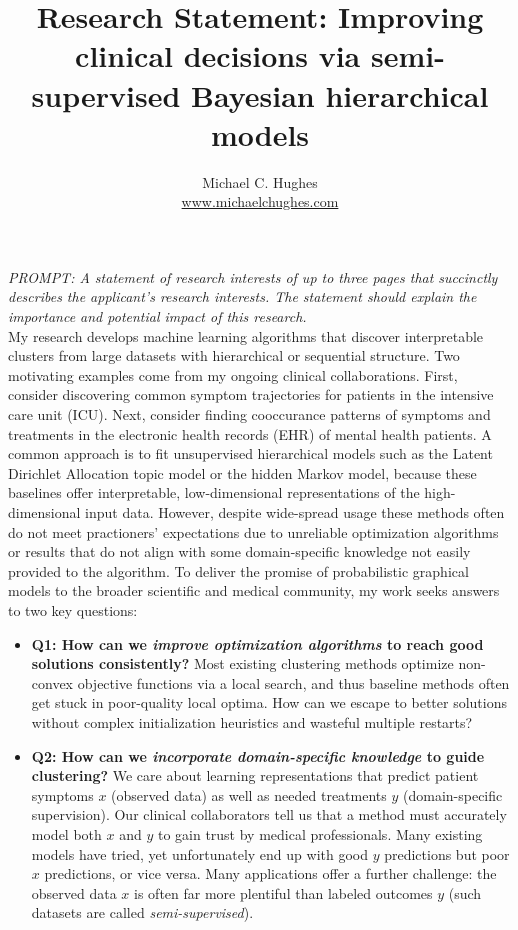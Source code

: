\documentclass[11pt,letterpaper,sans]{article}
\title{Research Statement: Improving clinical decisions via semi-supervised Bayesian hierarchical models}
\author{Michael C. Hughes \\ 
    \url{www.michaelchughes.com}
}
\begin{document}
\maketitle

\emph{PROMPT: A statement of research interests of up to three pages that succinctly describes the applicant's research interests. The statement should explain the importance and potential impact of this research.}
\\

My research develops machine learning
algorithms that discover interpretable clusters from large datasets with hierarchical or sequential structure.
Two motivating examples come from my ongoing clinical collaborations.
First, consider 
discovering common symptom trajectories for patients in the intensive care unit (ICU).
Next, consider finding cooccurance patterns of 
symptoms and treatments
in the electronic health records (EHR) of mental health patients.
A common approach is to fit unsupervised hierarchical models such as the 
Latent Dirichlet Allocation 
topic model or the hidden Markov model, because these baselines offer interpretable, low-dimensional representations of the high-dimensional input data.
However, despite wide-spread usage these methods often do not meet practioners' expectations due to
unreliable optimization algorithms
or 
results that do not align
with some domain-specific knowledge not easily provided to the algorithm.
To deliver the promise of probabilistic graphical models to the broader scientific and medical community, my work seeks answers to two key questions:

\begin{itemize}

\item \textbf{Q1: How can we \emph{improve optimization algorithms} to reach good solutions consistently?} Most existing clustering methods optimize non-convex objective functions via a local search, and thus baseline methods often get stuck in poor-quality local optima.
How can we escape to better solutions without complex initialization heuristics and wasteful multiple restarts?

\item \textbf{Q2: How can we \emph{incorporate domain-specific knowledge} to guide clustering?}
We care about learning representations that predict patient symptoms $x$ (observed data) as well as needed treatments $y$ (domain-specific supervision). Our clinical collaborators tell us that a method must accurately model both $x$ and $y$ to gain trust by medical professionals. Many existing models have tried, yet unfortunately end up with good $y$ predictions but poor $x$ predictions, or vice versa. Many applications offer a further challenge: the observed data $x$ is often far more plentiful than labeled outcomes $y$ (such datasets are called \emph{semi-supervised}).
\end{itemize}
\end{document}
